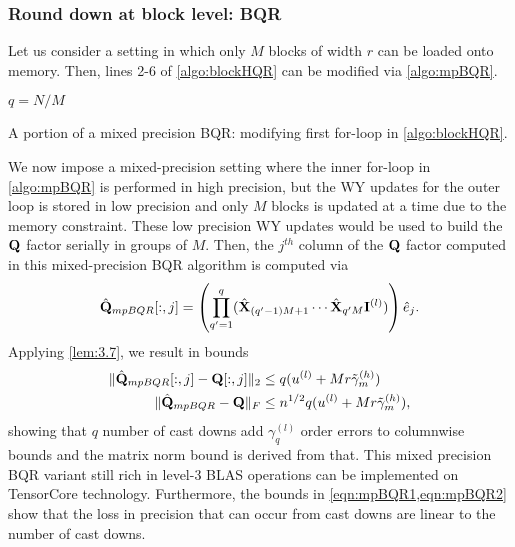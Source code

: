 \subsubsection{Round down at block level: BQR}\label{sec:mp-3b}
Let us consider a setting in which only $M$ blocks of width $r$ can be loaded onto memory.
Then, lines 2-6 of \cref{algo:blockHQR} can be modified via \cref{algo:mpBQR}.
\begin{algorithm2e}
	$q = N/M$
\caption{\label{algo:mpBQR} A portion of a mixed precision BQR: modifying first for-loop in \cref{algo:blockHQR}.}
\end{algorithm2e}
We now impose a mixed-precision setting where the inner for-loop in \cref{algo:mpBQR} is performed in high precision, but the WY updates for the outer loop is stored in low precision and only $M$ blocks is updated at a time due to the memory constraint.
These low precision WY updates would be used to build the $\mathbf{Q}$ factor serially in groups of $M$.
Then, the $j^{th}$ column of the $\mathbf{Q}$ factor computed in this mixed-precision BQR algorithm is computed via $$\hat{\mathbf{Q}}_{mpBQR}[:,j] = \left(\prod_{q'=1}^q(\hat{\mathbf{X}}_{(q'-1)M+1}\cdots\hat{\mathbf{X}}_{q'M}\mathbf{I}^{(l)})\right) \hat{e}_j.$$
Applying \cref{lem:3.7}, we result in bounds
\begin{align}
	\|\hat{\bb{Q}}_{mpBQR}[:,j] - \bb{Q}[:,j]\|_2 &\leq q(u^{(l)}+Mr\tilde{\gamma}_m^{(h)})\label{eqn:mpBQR1}\\%
	\|\hat{\bb{Q}}_{mpBQR} - \bb{Q}\|_F &\leq n^{1/2}q(u^{(l)}+Mr\tilde{\gamma}_m^{(h)}),\label{eqn:mpBQR2}
\end{align}
showing that $q$ number of cast downs add $\gamma_q^{(l)}$ order errors to columnwise bounds and the matrix norm bound is derived from that.
This mixed precision BQR variant still rich in level-3 BLAS operations can be implemented on TensorCore technology.
Furthermore, the bounds in \cref{eqn:mpBQR1,eqn:mpBQR2} show that the loss in precision that can occur from cast downs are linear to the number of cast downs.

